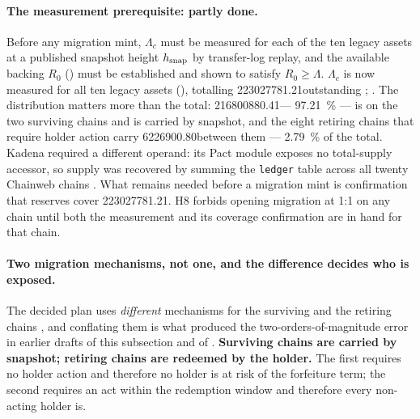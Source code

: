 \paragraph{The measurement prerequisite: partly done.} Before any migration mint, $\Lambda_c$ must be
measured for each of the ten legacy assets at a published snapshot height $h_{\mathrm{snap}}$ by
transfer-log replay, and the available backing $R_0$ () must be established and
shown to satisfy $R_0 \ge \Lambda$. $\Lambda_c$ is now measured for all ten legacy assets
(), totalling \num{223027781.21}\flux outstanding \shipped
{};
. The
distribution matters more than the total: \num{216800880.41}\flux --- \SI{97.21}{\percent} --- is on
the two surviving chains and is carried by snapshot, and the eight retiring chains that require
holder action carry \num{6226900.80}\flux between them --- \SI{2.79}{\percent} of the total.
Kadena required a different operand: its Pact module exposes no total-supply accessor, so supply was
recovered by summing the \texttt{ledger} table across all twenty Chainweb chains
. What remains needed before a migration mint is
confirmation that reserves cover \num{223027781.21}\flux. H8 forbids opening migration at 1:1 on any
chain until both the measurement and its coverage confirmation are in hand for that chain.

\paragraph{Two migration mechanisms, not one, and the difference decides who is exposed.} The
decided plan uses \emph{different} mechanisms for the surviving and the retiring chains
, and conflating them is what produced the
two-orders-of-magnitude error in earlier drafts of this subsection and of
. \textbf{Surviving chains are carried by snapshot; retiring chains are
redeemed by the holder.} The first requires no holder action and therefore no holder is at risk of
the forfeiture term; the second requires an act within the redemption window and therefore every
non-acting holder is. \planned

